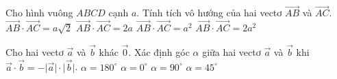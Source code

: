 \begin{ex}%
	Cho hình vuông $ABCD$ cạnh $a$. Tính tích vô hướng của hai vectơ $\overrightarrow{AB}$ và $\overrightarrow{AC}$.
	\choice
	{$\overrightarrow{AB}\cdot\overrightarrow{AC}=a\sqrt{2}$}
	{$\overrightarrow{AB}\cdot\overrightarrow{AC}=2a$}
	{\True $\overrightarrow{AB}\cdot\overrightarrow{AC}=a^2$}
	{$\overrightarrow{AB}\cdot\overrightarrow{AC}=2a^2$}
\end{ex}
\begin{ex}%
	Cho hai vectơ $\overrightarrow{a} $ và $\overrightarrow{b} $ khác $\overrightarrow{0} $. Xác định góc $\alpha $ giữa hai vectơ $\overrightarrow{a} $ và $\overrightarrow{b} $ khi $\overrightarrow{a} \cdot \overrightarrow{b}=-\big| \overrightarrow{a}\big| \cdot \big| \overrightarrow{b}\big| $.
	\choice
	{\True $\alpha=180^\circ $}
	{$\alpha=0^\circ $}
	{$\alpha=90^\circ $}
	{$\alpha=45^\circ $}
\end{ex}

